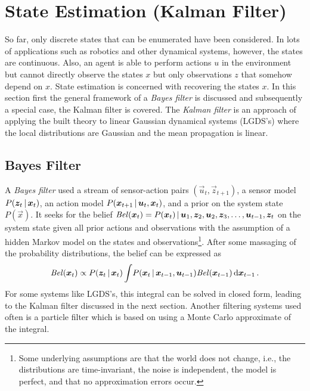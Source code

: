	\section{State Estimation (Kalman Filter)}
		So far, only discrete states that can be enumerated have been considered. In lots of applications such as robotics and other dynamical systems, however, the states are continuous. Also, an agent is able to perform actions \(u\) in the environment but cannot directly observe the states \(x\) but only observations \(z\) that somehow depend on \(x\). State estimation is concerned with recovering the states \(x\). In this section first the general framework of a \emph{Bayes filter} is discussed and subsequently a special case, the Kalman filter is covered. The \emph{Kalman filter} is an approach of applying the built theory to linear Gaussian dynamical systems (LGDS's) where the local distributions are Gaussian and the mean propagation is linear.

		\subsection{Bayes Filter}
			A \emph{Bayes filter} used a stream of sensor-action pairs \( (\vec{u}_t, \vec{z}_{t + 1}) \), a sensor model \( P(\bm{z}_t \,\vert\, \bm{x}_t) \), an action model \( P(\bm{x}_{t + 1} \,\vert\, \bm{u}_t, \bm{x}_t) \), and a prior on the system state \( P(\vec{x}) \). It seeks for the belief \( \mathit{Bel}(\bm{x}_t) = P(\bm{x}_t) \,\vert\, \bm{u}_1, \bm{z}_2, \bm{u}_2, \bm{z}_3, \dots, \bm{u}_{t - 1}, \bm{z}_t \) on the system state given all prior actions and observations with the assumption of a hidden Markov model on the states and observations\footnote{Some underlying assumptions are that the world does not change, i.e., the distributions are time-invariant, the noise is independent, the model is perfect, and that no approximation errors occur.}. After some massaging of the probability distributions, the belief can be expressed as
			\begin{equation}
				\mathit{Bel}(\bm{x}_t) \propto P(\bm{z}_t \,\vert\, \bm{x}_t) \int\! P(\bm{x}_t \,\vert\, \bm{x}_{t - 1}, \bm{u}_{t - 1}) \mathit{Bel}(\bm{x}_{t - 1}) \dd{\bm{x}_{t - 1}}.
			\end{equation}
			For some systems like LGDS's, this integral can be solved in closed form, leading to the Kalman filter discussed in the next section. Another filtering systems used often is a particle filter which is based on using a Monte Carlo approximate of the integral.

